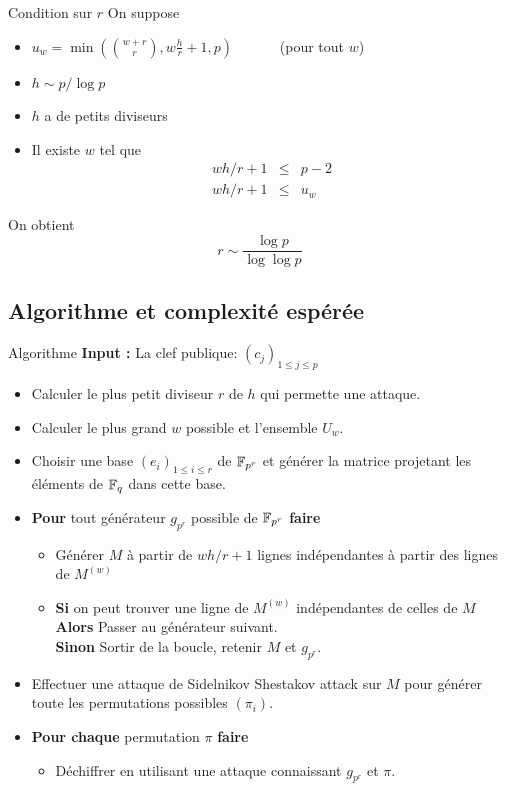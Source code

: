 \documentclass[]{beamer}
\begin{document}
\begin{frame}{Condition sur $r$}
On suppose
\begin{itemize}
\item $u_w = \min \left( \binom{w+r}{r}, w\frac{h}{r} + 1 , p \right)$  \ \ \ \ \ \ (pour tout $w$)
\item $h \sim p / \log p$
\item $h$ a de petits diviseurs
\item Il existe $w$ tel que
\begin{eqnarray*}
wh/r+1 &\leq & p-2 \\
wh/r+1 &\leq & u_w 
\end{eqnarray*}
\end{itemize} 
On obtient
$$ r \sim \frac{\log p}{\log \log p} $$
\end{frame}


\subsection{Algorithme et complexité espérée}

\begin{frame}{Algorithme}
\textbf{Input : } La clef publique: $(c_j)_{1 \leq j \leq p}$
\begin{itemize}
\item Calculer le plus petit diviseur $r$ de $h$ qui permette une attaque.

\item Calculer le plus grand $w$ possible et l'ensemble $U_w$.
\item Choisir une base $(e_i)_{1 \leq i \leq r}$ de $\mathbb{F}_{p^r}$ et générer la matrice projetant les éléments de $\mathbb{F}_q$ dans cette base.

\item \textbf{Pour} tout générateur $g_{p^r}$ possible de $\mathbb{F}_{p^r}$ \textbf{faire}
\begin{itemize}
\item Générer $M$ à partir de $wh/r+1$ lignes indépendantes à partir des lignes de $M^{(w)}$

\item \textbf{Si } on peut trouver une ligne de $M^{(w)}$ indépendantes de celles de $M$\\
\textbf{Alors } Passer au générateur suivant. \\
\textbf{Sinon } Sortir de la boucle, retenir $M$ et $g_{p^r}$.
\end{itemize}
\item Effectuer une attaque de Sidelnikov Shestakov attack sur $M$ pour générer toute les permutations possibles $(\pi_i)$.
\item \textbf{Pour chaque } permutation $\pi$ \textbf{ faire }
\begin{itemize}
\item Déchiffrer en utilisant une attaque connaissant $g_{p^r}$ et $\pi$.
\end{itemize}
\end{itemize}
\end{frame}
\end{document}
